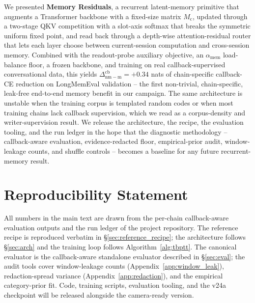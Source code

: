 \documentclass[11pt]{article}
\newcommand{\Mc}{M_{\mathrm{c}}}
\newcommand{\dnm}{\Delta_{\mathrm{nm{-}m}}}
\newcommand{\amem}{\alpha_{\mathrm{mem}}}
\begin{document}
We presented \textbf{Memory Residuals}, a recurrent latent-memory
primitive that augments a Transformer backbone with a fixed-size
matrix $\Mc$, updated through a two-stage QKV competition with a
slot-axis softmax that breaks the symmetric uniform fixed point, and
read back through a depth-wise attention-residual router that lets
each layer choose between current-session computation and
cross-session memory. Combined with the readout-probe auxiliary
objective, an $\amem$ load-balance floor, a frozen backbone, and
training on real callback-supervised conversational data, this yields
$\dnm^{\mathrm{cb}} = +0.34$ nats of chain-specific callback-CE
reduction on LongMemEval validation -- the first non-trivial,
chain-specific, leak-free end-to-end memory benefit in our
campaign. The same architecture is unstable when the training corpus
is templated random codes or when most training chains lack callback
supervision, which we read as a corpus-density and
writer-supervision result. We release the architecture, the recipe,
the evaluation tooling, and the run ledger in the hope that the
diagnostic methodology -- callback-aware evaluation, evidence-redacted
floor, empirical-prior audit, window-leakage counts, and shuffle
controls -- becomes a baseline for any future recurrent-memory
result.

\section*{Reproducibility Statement}

All numbers in the main text are drawn from the per-chain
callback-aware evaluation outputs and the run ledger of the project
repository. The reference recipe is reproduced verbatim in
\S\ref{sec:reference_recipe}; the architecture follows
\S\ref{sec:arch} and the training loop follows
Algorithm~\ref{alg:tbptt}. The canonical evaluator is the
callback-aware standalone evaluator described in \S\ref{sec:eval};
the audit tools cover window-leakage counts (Appendix~\ref{app:window_leak}),
redaction-spread variance (Appendix~\ref{app:redaction}), and the
empirical category-prior fit. Code, training scripts, evaluation
tooling, and the v24a checkpoint will be released alongside the
camera-ready version.
\end{document}
